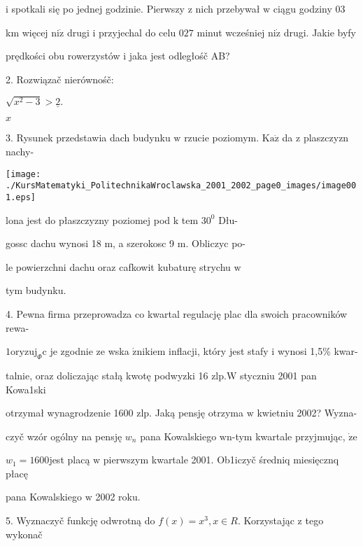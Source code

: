 \documentclass[a4paper,12pt]{article}
\begin{document}
$\mathrm{i}$ spotkali się po jednej godzinie. Pierwszy $\mathrm{z}$ nich przebywał $\mathrm{w}$ ciągu godziny $03$

km więcej $\mathrm{n}\mathrm{i}\dot{\mathrm{z}}$ drugi $\mathrm{i}$ przyjechal do celu $027$ minut wcześniej $\mathrm{n}\mathrm{i}\dot{\mathrm{z}}$ drugi. Jakie byfy

prędkości obu rowerzystów $\mathrm{i}$ jaka jest odległośč AB?

2. Rozwiązač nierównośč:

$\sqrt{x^{2}-3}>\underline{2}.$

$x$

3. Rysunek przedstawia dach budynku $\mathrm{w}$ rzucie poziomym. $\mathrm{K}\mathrm{a}\dot{\mathrm{z}}$ da $\mathrm{z}$ plaszczyzn nachy-
\begin{center}
\texttt{[image: ./KursMatematyki\_PolitechnikaWroclawska\_2001\_2002\_page0\_images/image001.eps]}
\end{center}
lona jest do płaszczyzny poziomej pod $\mathrm{k}$ tem $30^{0}$ Dłu-

gossc dachu wynosi 18 $\mathrm{m}$, a szerokosc 9 $\mathrm{m}$. Obliczyc po-

le powierzchni dachu oraz cafkowit kubaturę strychu $\mathrm{w}$

tym budynku.

4. Pewna firma przeprowadza co kwartal regulację plac dla swoich pracowników rewa-

$1\mathrm{o}\mathrm{r}\mathrm{y}\mathrm{z}\mathrm{u}\mathrm{j}_{\Phi}\mathrm{c}$ je zgodnie ze wska $\acute{\mathrm{z}}\mathrm{n}\mathrm{i}\mathrm{k}\mathrm{i}\mathrm{e}\mathrm{m}$ inflacji, który jest stafy $\mathrm{i}$ wynosi 1,5\% kwar-

talnie, oraz doliczając stałą kwotę podwyzki 16 $\mathrm{z}\mathrm{l}\mathrm{p}. \mathrm{W}$ styczniu 2001 pan Kowa1ski

otrzymał wynagrodzenie 1600 $\mathrm{z}\mathrm{l}\mathrm{p}$. Jaką pensję otrzyma $\mathrm{w}$ kwietniu 2002? Wyzna-

czyč wzór ogólny na pensję $w_{n}$ pana Kowalskiego $\mathrm{w}\mathrm{n}$-tym kwartale przyjmując, $\dot{\mathrm{z}}\mathrm{e}$

$w_{1}=1600$jest placą $\mathrm{w}$ pierwszym kwartale 2001. Ob1iczyč średniq miesięcznq płacę

pana Kowalskiego $\mathrm{w}$ 2002 roku.

5. Wyznaczyč funkcję odwrotną do $f(x) =x^{3}, x\in R$. Korzystając $\mathrm{z}$ tego wykonač
\end{document}
